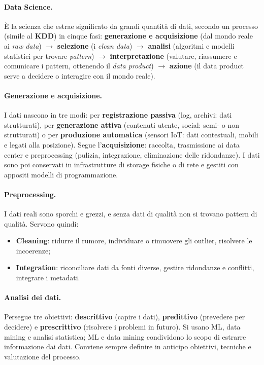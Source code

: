 \paragraph*{Data Science.}
È la scienza che estrae significato da grandi quantità di dati, secondo un processo (simile al \textbf{KDD}) in cinque fasi: \textbf{generazione e acquisizione} (dal mondo reale ai \emph{raw data}) $\rightarrow$ \textbf{selezione} (i \emph{clean data}) $\rightarrow$ \textbf{analisi} (algoritmi e modelli statistici per trovare \emph{pattern}) $\rightarrow$ \textbf{interpretazione} (valutare, riassumere e comunicare i pattern, ottenendo il \emph{data product}) $\rightarrow$ \textbf{azione} (il data product serve a decidere o interagire con il mondo reale).

\paragraph*{Generazione e acquisizione.}
I dati nascono in tre modi: per \textbf{registrazione passiva} (log, archivi: dati strutturati), per \textbf{generazione attiva} (contenuti utente, social: semi- o non strutturati) o per \textbf{produzione automatica} (sensori IoT: dati contestuali, mobili e legati alla posizione). Segue l'\textbf{acquisizione}: raccolta, trasmissione ai data center e preprocessing (pulizia, integrazione, eliminazione delle ridondanze). I dati sono poi conservati in infrastrutture di storage fisiche o di rete e gestiti con appositi modelli di programmazione.

\paragraph*{Preprocessing.}
I dati reali sono sporchi e grezzi, e senza dati di qualità non si trovano pattern di qualità. Servono quindi:
\begin{itemize}
    \item \textbf{Cleaning}: ridurre il rumore, individuare o rimuovere gli outlier, risolvere le incoerenze;
    \item \textbf{Integration}: riconciliare dati da fonti diverse, gestire ridondanze e conflitti, integrare i metadati.
\end{itemize}

\paragraph*{Analisi dei dati.}
Persegue tre obiettivi: \textbf{descrittivo} (capire i dati), \textbf{predittivo} (prevedere per decidere) e \textbf{prescrittivo} (risolvere i problemi in futuro). Si usano ML, data mining e analisi statistica; ML e data mining condividono lo scopo di estrarre informazione dai dati. Conviene sempre definire in anticipo obiettivi, tecniche e valutazione del processo.

